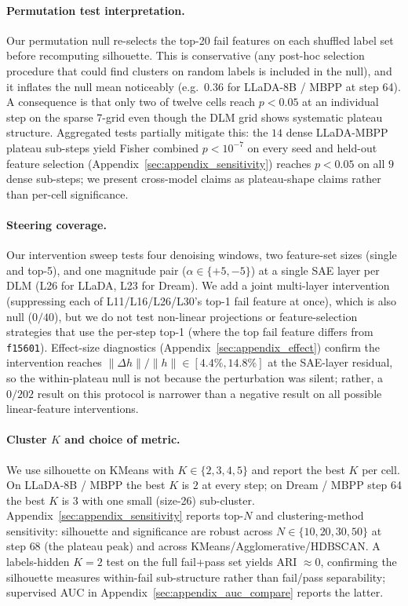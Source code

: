 \documentclass[11pt]{article}
\begin{document}
\paragraph{Permutation test interpretation.}
Our permutation null re-selects the top-20 fail features on each shuffled label set before recomputing silhouette.
This is conservative (any post-hoc selection procedure that could find clusters on random labels is included in the null), and it inflates the null mean noticeably (e.g.\ $0.36$ for LLaDA-8B / MBPP at step 64).
A consequence is that only two of twelve cells reach $p\!<\!0.05$ at an individual step on the sparse 7-grid even though the DLM grid shows systematic plateau structure.
Aggregated tests partially mitigate this: the $14$ dense LLaDA-MBPP plateau sub-steps yield Fisher combined $p\!<\!10^{-7}$ on every seed and held-out feature selection (Appendix~\ref{sec:appendix_sensitivity}) reaches $p\!<\!0.05$ on all $9$ dense sub-steps; we present cross-model claims as plateau-shape claims rather than per-cell significance.

\paragraph{Steering coverage.}
Our intervention sweep tests four denoising windows, two feature-set sizes (single and top-5), and one magnitude pair ($\alpha\!\in\!\{+5,-5\}$) at a single SAE layer per DLM (L26 for LLaDA, L23 for Dream).
We add a joint multi-layer intervention (suppressing each of L11/L16/L26/L30's top-1 fail feature at once), which is also null ($0/40$), but we do not test non-linear projections or feature-selection strategies that use the per-step top-1 (where the top fail feature differs from \texttt{f15601}).
Effect-size diagnostics (Appendix~\ref{sec:appendix_effect}) confirm the intervention reaches $\|\Delta h\| / \|h\| \in [4.4\%, 14.8\%]$ at the SAE-layer residual, so the within-plateau null is not because the perturbation was silent; rather, a $0/202$ result on this protocol is narrower than a negative result on all possible linear-feature interventions.

\paragraph{Cluster $K$ and choice of metric.}
We use silhouette on KMeans with $K\!\in\!\{2,3,4,5\}$ and report the best $K$ per cell.
On LLaDA-8B / MBPP the best $K$ is $2$ at every step; on Dream / MBPP step 64 the best $K$ is $3$ with one small (size-26) sub-cluster.
Appendix~\ref{sec:appendix_sensitivity} reports top-$N$ and clustering-method sensitivity: silhouette and significance are robust across $N\!\in\!\{10,20,30,50\}$ at step $68$ (the plateau peak) and across KMeans/Agglomerative/HDBSCAN.
A labels-hidden $K{=}2$ test on the full fail+pass set yields ARI $\approx 0$, confirming the silhouette measures within-fail sub-structure rather than fail/pass separability; supervised AUC in Appendix~\ref{sec:appendix_auc_compare} reports the latter.
\end{document}
